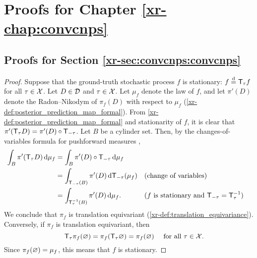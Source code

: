 \documentclass[12pt, twoside]{report}
\newcommand{\xrprefix}[1]{xr-#1}
\begin{document}
\chapter
    {Proofs for Chapter \ref{\xrprefix{chap:convcnps}}}
\label{app:proofs_convcnps}

\section{Proofs for Section \ref{\xrprefix{sec:convcnps:convcnps}}}
\label{sec:proofs_convcnps:convcnps}

\begin{proof}
    Suppose that the ground-truth stochastic process $f$ is stationary: $f \disteq \T_\tau f$ for all $\tau \in \mathcal{X}$.
    Let $D \in \mathcal{D}$ and $\tau \in \mathcal{X}$.
    Let $\mu_f$ denote the law of $f$, 
    and let $\pi'(D)$ denote the Radon--Nikodym of $\pi_f(D)$ with respect to $\mu_f$ (\cref{\xrprefix{def:posterior_prediction_map_formal}}).
    From \cref{\xrprefix{def:posterior_prediction_map_formal}} and stationarity of $f$, 
    it is clear that $\pi'(\T_\tau D) = \pi'(D) \comp \T_{-\tau}$.
    Let $B$ be a cylinder set.
    Then, by the changes-of-variables formula for pushforward measures \parencite[Theorem 14.1;][]{Schilling:2005:Measures_Integrals_and_Martingales},%
    \begin{align}
        \int_B \pi'(\T_\tau D) \isd \mu_f
        &= \int_B \pi'(D) \comp \T_{-\tau} \isd \mu_f \\
        &= \int_{\T_{-\tau}(B)} \pi'(D) \isd \T_{-\tau}(\mu_f) &&\text{(change of variables)}\\
        &= \int_{\T^{-1}_{\tau}(B)} \pi'(D) \isd \mu_f. && \text{($f$ is stationary and $\T_{-\tau} = \T^{-1}_\tau$)}
    \end{align}
    We conclude that $\pi_f$ is translation equivariant (\cref{\xrprefix{def:translation_equivariance}}).
    Conversely, if $\pi_f$ is translation equivariant, then
    \begin{equation}
        \T_\tau \pi_f(\es) = \pi_f(\T_\tau \es) = \pi_f(\es)
        \quad\text{ for all $\tau \in \X$}.\hspace{-15pt}
    \end{equation}
    Since $\pi_f(\varnothing) = \mu_f$, this means that $f$ is stationary.
\end{proof}
\end{document}
